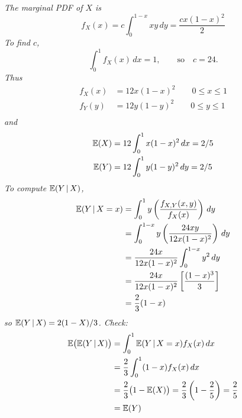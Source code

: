 \begin{exercise}
\begin{questions}
\begin{answer}
\ben
\it %
The marginal PDF of $X$ is
\[
f_X(x) = c\int_{0}^{1-x} xy\,dy = \frac{cx(1-x)^2}{2}
\]
To find $c$,
\[
\int_{0}^{1} f_X(x)\,dx = 1, \qquad\text{so}\quad c=24.
\]
Thus
\begin{align*}
f_X(x)	& = 12x(1-x)^2 \qquad 0\leq x\leq 1 \\
f_Y(y)	& = 12y(1-y)^2 \qquad 0\leq y\leq 1 \\
\end{align*}
and
\begin{align*}
\mathbb{E}(X) & = 12\int_0^1 x(1-x)^2\,dx = 2/5 \\
\mathbb{E}(Y) & = 12\int_0^1 y(1-y)^2\,dy = 2/5 \\
\end{align*}
\it %
To compute $\mathbb{E}(Y\,|\,X)$,
\begin{align*}
\mathbb{E}(Y\,|\,X=x)
	& = \int_0^1 y\left(\frac{f_{X,Y}(x,y)}{f_X(x)}\right)\,dy \\
	& = \int_0^{1-x} y\left(\frac{24xy}{12x(1-x)^2}\right)\,dy \\
	& = \frac{24x}{12x(1-x)^2}\int_0^{1-x} y^2\,dy \\
	& =  \frac{24x}{12x(1-x)^2}\left[\frac{(1-x)^3}{3}\right] \\
	& = \frac{2}{3}(1-x)	
\end{align*}
so $\mathbb{E}(Y\,|\,X) = 2(1-X)/3$.
\it %
Check:
\begin{align*}
\mathbb{E}\big(\mathbb{E}(Y\,|\,X)\big)
	& = \int_0^1 \mathbb{E}(Y\,|\,X=x) f_X(x)\,dx \\
	& = \frac{2}{3}\int_0^1 (1-x) f_X(x)\,dx \\
	& = \frac{2}{3}\big(1-\mathbb{E}(X)\big) = \frac{2}{3}\left(1-\frac{2}{5}\right) = \frac{2}{5} \\
	& = \mathbb{E}(Y)
\end{align*}
\een
\end{answer}



\end{questions}
\end{exercise}

\endinput
